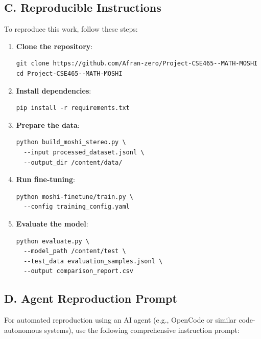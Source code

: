 \documentclass[12pt,a4paper]{article}
\begin{document}
\subsection*{C. Reproducible Instructions}
To reproduce this work, follow these steps:

\begin{enumerate}[leftmargin=1.5em]
    \item \textbf{Clone the repository}:
    \begin{verbatim}
git clone https://github.com/Afran-zero/Project-CSE465--MATH-MOSHI
cd Project-CSE465--MATH-MOSHI
    \end{verbatim}
    
    \item \textbf{Install dependencies}:
    \begin{verbatim}
pip install -r requirements.txt
    \end{verbatim}
    
    \item \textbf{Prepare the data}:
    \begin{verbatim}
python build_moshi_stereo.py \
  --input processed_dataset.jsonl \
  --output_dir /content/data/
    \end{verbatim}
    
    \item \textbf{Run fine-tuning}:
    \begin{verbatim}
python moshi-finetune/train.py \
  --config training_config.yaml
    \end{verbatim}
    
    \item \textbf{Evaluate the model}:
    \begin{verbatim}
python evaluate.py \
  --model_path /content/test \
  --test_data evaluation_samples.jsonl \
  --output comparison_report.csv
    \end{verbatim}
\end{enumerate}

\subsection*{D. Agent Reproduction Prompt}
For automated reproduction using an AI agent (e.g., OpenCode or similar code-autonomous systems), use the following comprehensive instruction prompt:
\end{document}
